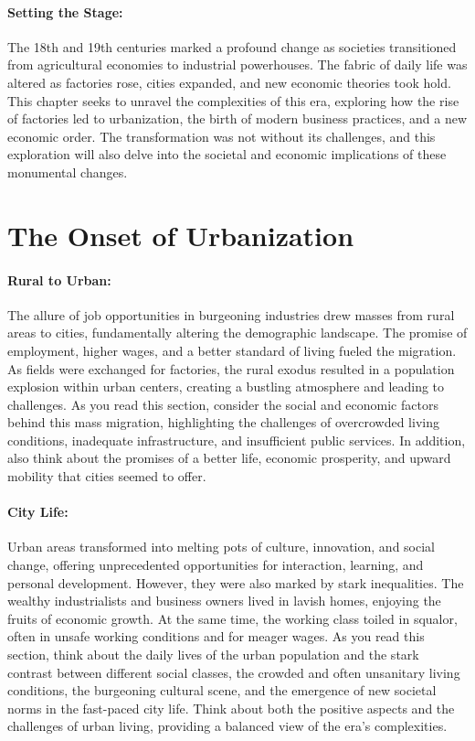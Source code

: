 \documentclass{book}
\begin{document}
\paragraph{Setting the Stage:}
The 18th and 19th centuries marked a profound change as societies transitioned from agricultural economies to industrial powerhouses. The fabric of daily life was altered as factories rose, cities expanded, and new economic theories took hold. This chapter seeks to unravel the complexities of this era, exploring how the rise of factories led to urbanization, the birth of modern business practices, and a new economic order. The transformation was not without its challenges, and this exploration will also delve into the societal and economic implications of these monumental changes.

\section*{The Onset of Urbanization}

\paragraph{Rural to Urban:}
The allure of job opportunities in burgeoning industries drew masses from rural areas to cities, fundamentally altering the demographic landscape. The promise of employment, higher wages, and a better standard of living fueled the migration. As fields were exchanged for factories, the rural exodus resulted in a population explosion within urban centers, creating a bustling atmosphere and leading to challenges. As you read this section, consider the social and economic factors behind this mass migration, highlighting the challenges of overcrowded living conditions, inadequate infrastructure, and insufficient public services. In addition, also think about the promises of a better life, economic prosperity, and upward mobility that cities seemed to offer.

\paragraph{City Life:}
Urban areas transformed into melting pots of culture, innovation, and social change, offering unprecedented opportunities for interaction, learning, and personal development. However, they were also marked by stark inequalities. The wealthy industrialists and business owners lived in lavish homes, enjoying the fruits of economic growth. At the same time, the working class toiled in squalor, often in unsafe working conditions and for meager wages. As you read this section, think about the daily lives of the urban population and the stark contrast between different social classes, the crowded and often unsanitary living conditions, the burgeoning cultural scene, and the emergence of new societal norms in the fast-paced city life. Think about both the positive aspects and the challenges of urban living, providing a balanced view of the era’s complexities.
\end{document}
